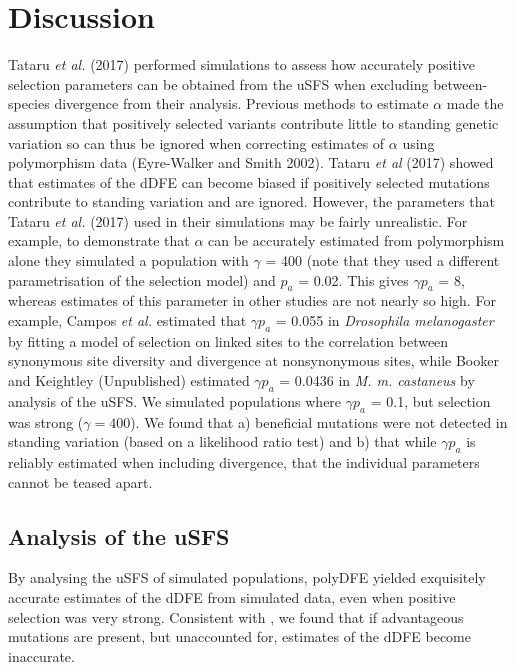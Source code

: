 \section*{Discussion}

Tataru \textit{et al.} (2017) performed simulations to assess how accurately positive selection parameters can be obtained from the uSFS when excluding between-species divergence from their analysis. Previous methods to estimate $\alpha$ made the assumption that positively selected variants contribute little  to standing genetic variation so can thus be ignored when correcting estimates of $\alpha$ using polymorphism data (Eyre-Walker and Smith 2002). Tataru \textit{et al} (2017) showed  that estimates of the dDFE can become biased if positively selected mutations contribute to standing variation and are ignored. However, the parameters that Tataru \textit{et al.} (2017) used in their simulations may be fairly unrealistic. For example, to demonstrate that $\alpha$ can be accurately estimated from polymorphism alone they simulated a population with $\gamma$ = 400 (note that they used a different parametrisation of the selection model) and $p_a$ = 0.02. This gives $\gamma p_a$ = 8, whereas estimates of this parameter in other studies are not nearly so high. For example, Campos \textit{et al.} estimated that $\gamma p_a$ = 0.055 in \textit{Drosophila melanogaster} by fitting a model of selection on linked sites to the correlation between synonymous site diversity and divergence at nonsynonymous sites, while Booker and Keightley (Unpublished) estimated $\gamma p_a$ = 0.0436 in \textit{M. m. castaneus} by analysis of the uSFS. We simulated populations where $\gamma p_a$ = 0.1, but selection was strong ($\gamma = 400$). We found that a) beneficial mutations were not detected in standing variation (based on a likelihood ratio test) and b) that while $\gamma p_a$ is reliably estimated when including divergence, that the individual parameters cannot be teased apart. 

\subsection{Analysis of the uSFS}

By analysing the uSFS of simulated populations, polyDFE yielded exquisitely accurate estimates of the dDFE from simulated data, even when positive selection was very strong. Consistent with \cite{RN354}, we found that if advantageous mutations are present, but unaccounted for, estimates of the dDFE become inaccurate. 


